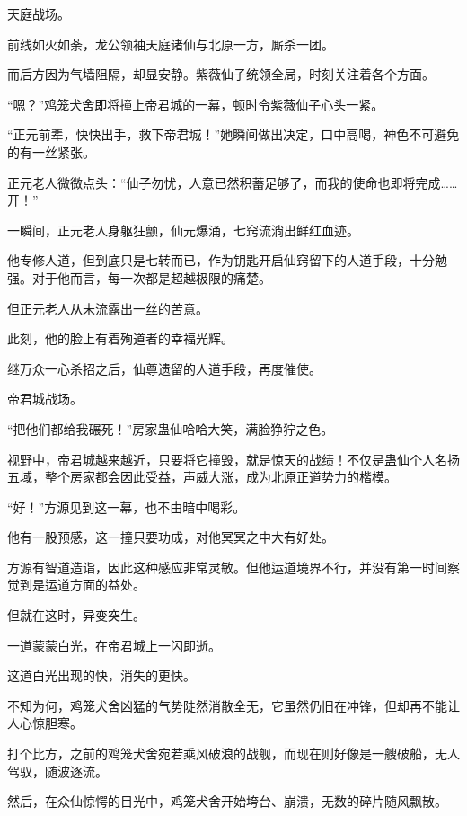 
\begin{this_body}



天庭战场。

前线如火如荼，龙公领袖天庭诸仙与北原一方，厮杀一团。

而后方因为气墙阻隔，却显安静。紫薇仙子统领全局，时刻关注着各个方面。

“嗯？”鸡笼犬舍即将撞上帝君城的一幕，顿时令紫薇仙子心头一紧。

“正元前辈，快快出手，救下帝君城！”她瞬间做出决定，口中高喝，神色不可避免的有一丝紧张。

正元老人微微点头：“仙子勿忧，人意已然积蓄足够了，而我的使命也即将完成……开！”

一瞬间，正元老人身躯狂颤，仙元爆涌，七窍流淌出鲜红血迹。

他专修人道，但到底只是七转而已，作为钥匙开启仙窍留下的人道手段，十分勉强。对于他而言，每一次都是超越极限的痛楚。

但正元老人从未流露出一丝的苦意。

此刻，他的脸上有着殉道者的幸福光辉。

继万众一心杀招之后，仙尊遗留的人道手段，再度催使。

帝君城战场。

“把他们都给我碾死！”房家蛊仙哈哈大笑，满脸狰狞之色。

视野中，帝君城越来越近，只要将它撞毁，就是惊天的战绩！不仅是蛊仙个人名扬五域，整个房家都会因此受益，声威大涨，成为北原正道势力的楷模。

“好！”方源见到这一幕，也不由暗中喝彩。

他有一股预感，这一撞只要功成，对他冥冥之中大有好处。

方源有智道造诣，因此这种感应非常灵敏。但他运道境界不行，并没有第一时间察觉到是运道方面的益处。

但就在这时，异变突生。

一道蒙蒙白光，在帝君城上一闪即逝。

这道白光出现的快，消失的更快。

不知为何，鸡笼犬舍凶猛的气势陡然消散全无，它虽然仍旧在冲锋，但却再不能让人心惊胆寒。

打个比方，之前的鸡笼犬舍宛若乘风破浪的战舰，而现在则好像是一艘破船，无人驾驭，随波逐流。

然后，在众仙惊愕的目光中，鸡笼犬舍开始垮台、崩溃，无数的碎片随风飘散。


\end{this_body}
